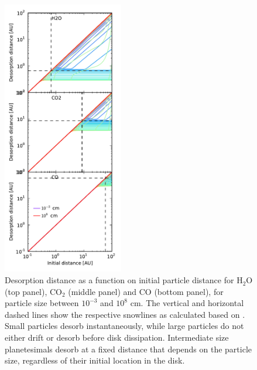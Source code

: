 \documentclass[manuscript]{aastex}
\begin{document}
\begin{figure}[htb]
\centering
\includegraphics[width=0.47\textwidth]{../figs/desorption_distance_many_new_2.pdf}
\caption{Desorption distance as a function on initial particle distance for H$_2$O (top panel), CO$_2$ (middle panel) and CO (bottom panel), for particle size between $10^{-3}$ and $10^8$ cm. The vertical and horizontal dashed lines show the respective snowlines as calculated based on \citet{hollenbach09}. Small particles desorb instantaneously, while large particles do not either drift or desorb before disk dissipation. Intermediate size planetesimals desorb at a fixed distance that depends on the particle size, regardless of their initial location in the disk.} %
\label{fig:drift_dist}
\end{figure}
\end{document}
